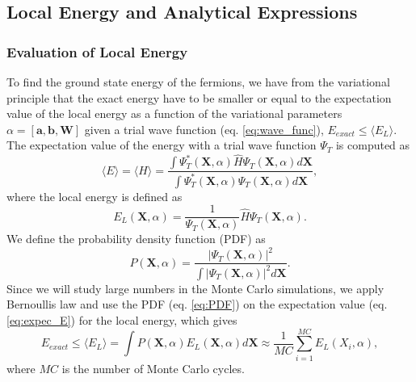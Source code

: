 \documentclass[12pt,a4paper,english]{article}
\begin{document}
\subsection{Local Energy and Analytical Expressions}
\label{subsect:E_L}
\subsubsection{Evaluation of Local Energy}
\label{subsubsect:eval E_L}
To find the ground state energy of the fermions, we have from the variational principle that the exact energy have to be smaller or equal to the expectation value of the local energy as a function of the variational parameters $\alpha=[\textbf{a}, \textbf{b}, \textbf{W}]$ given a trial wave function (eq. \ref{eq:wave_func}), $E_{exact}\leq \langle E_L \rangle$. The expectation value of the energy with a trial wave function $\Psi_T$ is computed as
\begin{equation}
\label{eq:expec_E}
\langle E\rangle=\langle H\rangle=\frac{\int \Psi_T^*(\textbf{X}, \alpha)\hat{H}\Psi_T(\textbf{X}, \alpha)d\textbf{X}}
{\int\Psi_T^*(\textbf{X}, \alpha)\Psi_T(\textbf{X}, \alpha)d\textbf{X}},
\end{equation}
where the local energy is defined as 
\begin{equation}
\label{eq:def_EL}
E_L(\textbf{X}, \alpha)=\frac{1}{\Psi_T(\textbf{X}, \alpha)}\hat{H}\Psi_T(\textbf{X}, \alpha).
\end{equation}
We define the probability density function (PDF) as
\begin{equation}
\label{eq:PDF}
P(\textbf{X}, \alpha)=\frac{|\Psi_T(\textbf{X}, \alpha)|^2}{\int|\Psi_T(\textbf{X}, \alpha)|^2d\textbf{X}}.
\end{equation}
Since we will study large numbers in the Monte Carlo simulations, we apply Bernoullis law and use the PDF (eq. \ref{eq:PDF}) on the expectation value (eq. \ref{eq:expec_E}) for the local energy, which gives
\begin{equation}
\label{eq:expect_EL}
E_{exact}\leq\langle E_L \rangle=\int P(\textbf{X}, \alpha)E_L(\textbf{X}, \alpha)d\textbf{X}\approx \frac{1}{MC}\sum_{i=1}^{MC}E_L(X_i, \alpha),
\end{equation}
where $MC$ is the number of Monte Carlo cycles.
\end{document}
